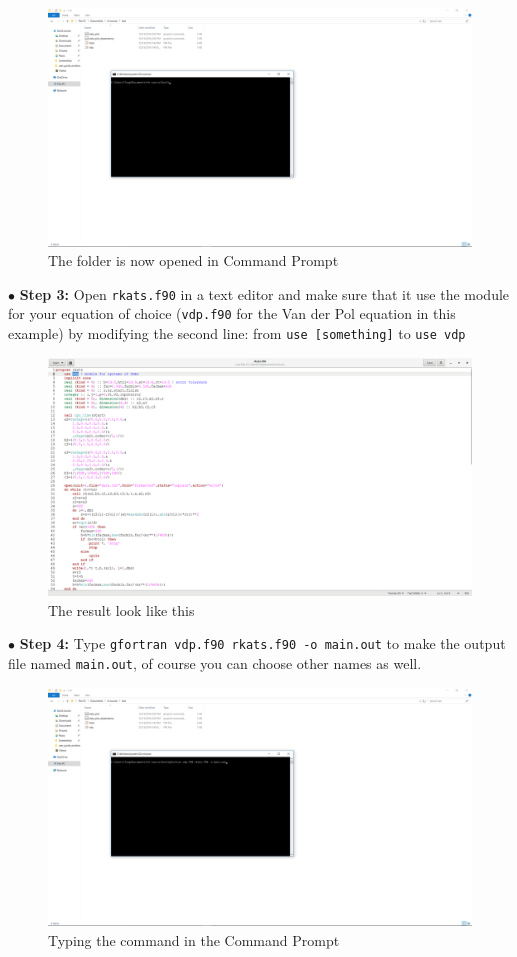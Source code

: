 \documentclass[a4paper,oneside]{book}
\numberwithin{equation}{chapter}
\begin{document}
	\begin{figure}[H]
		\centering	\includegraphics[width=15cm]{wfig3}
		\caption{The folder is now opened in Command Prompt}
	\end{figure}
	\noindent$\bullet$ \textbf{Step 3:} Open \texttt{rkats.f90} in a text editor and make sure that it use the module for your equation of choice (\texttt{vdp.f90} for the Van der Pol equation in this example) by modifying the second line: from \texttt{use [something]} to \texttt{use vdp}
	\begin{figure}[H]
		\centering	\includegraphics[width=15cm]{wfig4}
		\caption{The result look like this}
	\end{figure}
	\noindent$\bullet$ \textbf{Step 4:} Type \texttt{gfortran vdp.f90 rkats.f90 -o main.out} to make the output file named \texttt{main.out}, of course you can choose other names as well.
	\begin{figure}[H]
		\centering	\includegraphics[width=15cm]{wfig5}
		\caption{Typing the command in the Command Prompt}
	\end{figure}
\end{document}
